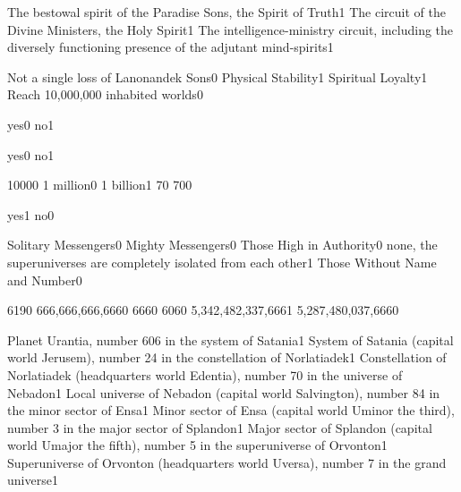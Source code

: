 {The bestowal spirit of the Paradise Sons, the Spirit of Truth}{1}
{The circuit of the Divine Ministers, the Holy Spirit}{1}
{The intelligence-ministry circuit, including the diversely functioning presence of the adjutant mind-spirits}{1}
\qstop

{Not a single loss of Lanonandek Sons}{0}
{Physical Stability}{1}
{Spiritual Loyalty}{1}
{Reach 10,000,000 inhabited worlds}{0}
\qstop

{yes}{0}
{no}{1}
\qstop

{yes}{0}
{no}{1}
\qstop

{1000}{0}
{1 million}{0}
{1 billion}{1}
{7}{0}
{70}{0}
\qstop

{yes}{1}
{no}{0}
\qstop

{Solitary Messengers}{0}
{Mighty Messengers}{0}
{Those High in Authority}{0}
{none, the superuniverses are completely isolated from each other}{1}
{Those Without Name and Number}{0}
\qstop

{619}{0}
{666,666,666,666}{0}
{666}{0}
{606}{0}
{5,342,482,337,666}{1}
{5,287,480,037,666}{0}
\qstop

{Planet Urantia, number 606 in the system of Satania}{1}
{System of Satania (capital world Jerusem), number 24 in the constellation of Norlatiadek}{1}
{Constellation of Norlatiadek (headquarters world Edentia), number 70 in the universe of Nebadon}{1}
{Local universe of Nebadon (capital world Salvington), number 84 in the minor sector of Ensa}{1}
{Minor sector of Ensa (capital world Uminor the third), number 3 in the major sector of Splandon}{1}
{Major sector of Splandon (capital world Umajor the fifth), number 5 in the superuniverse of Orvonton}{1}
{Superuniverse of Orvonton (headquarters world Uversa), number 7 in the grand universe}{1}
\qstop

